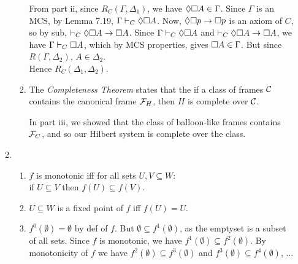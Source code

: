 \documentclass[a4paper, draft, 12pt]{article}
\begin{document}
\begin{enumerate}
\begin{enumerate}
\begin{enumerate}
  From part ii, since $R_C(\Gamma, \Delta_1)$, we have $\Diamond \square A \in \Gamma$. 
  Since $\Gamma$ is an MCS, by Lemma 7.19, $\Gamma \vdash_C \Diamond \square A$.
  Now, $\Diamond \square p \rightarrow \square p$ is an axiom of $C$, so by sub, 
  $\vdash_C \Diamond \square A \rightarrow \square A$. 
  Since $\Gamma \vdash_C \Diamond \square A$ and  $\vdash_C \Diamond \square A \rightarrow \square A$, 
  we have $\Gamma \vdash_C \square A$, which by MCS properties, gives $\square A \in \Gamma$. 
  But since $R(\Gamma, \Delta_2)$, $A \in \Delta_2$. \\
  Hence $R_C(\Delta_1, \Delta_2)$.
  \item
  The \textit{Completeness Theorem} states that the 
  if a class of frames $\mathcal{C}$ contains the canonical frame $\mathcal{F}_H$,
  then $H$ is complete over $\mathcal{C}$. 

  In part iii, we showed 
  that the class of balloon-like frames contains $\mathcal{F}_C$, 
  and so our Hilbert system is complete over the class.
  \end{enumerate}
  \item 
  \begin{enumerate}
  \item  
  $f$ is monotonic iff for all sets $U,V \subseteq W$:\\
  if $U \subseteq V$ then $f(U) \subseteq f(V)$. 
  \item
  $U \subseteq W$ is a fixed point of $f$ iff $f(U) = U$.
  \item 
  $f^0(\emptyset) = \emptyset$ by def of $f$.
  But $\emptyset \subseteq f^1(\emptyset)$, as the emptyset is a subset of all sets.
  Since $f$ is monotonic, we have $f^1(\emptyset) \subseteq f^2(\emptyset)$. 
  By monotonicity of $f$ we have $f^2(\emptyset) \subseteq f^3(\emptyset)$
  and $f^3(\emptyset) \subseteq f^4(\emptyset)$, ...


\end{enumerate}
\end{enumerate}
\end{enumerate}
\end{document}
